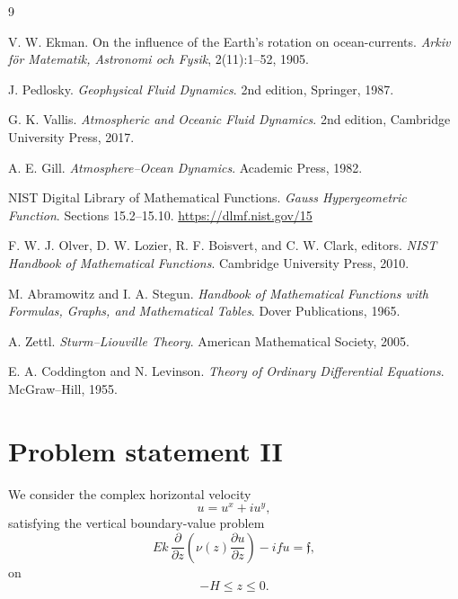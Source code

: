 \documentclass[10pt]{amsart}
\begin{document}
\begin{thebibliography}{9}

V. W. Ekman.
\newblock On the influence of the Earth's rotation on ocean-currents.
\newblock \emph{Arkiv f\"or Matematik, Astronomi och Fysik}, 2(11):1--52, 1905.

J. Pedlosky.
\newblock \emph{Geophysical Fluid Dynamics}.
\newblock 2nd edition, Springer, 1987.

G. K. Vallis.
\newblock \emph{Atmospheric and Oceanic Fluid Dynamics}.
\newblock 2nd edition, Cambridge University Press, 2017.

A. E. Gill.
\newblock \emph{Atmosphere--Ocean Dynamics}.
\newblock Academic Press, 1982.

NIST Digital Library of Mathematical Functions.
\newblock \emph{Gauss Hypergeometric Function}.
\newblock Sections 15.2--15.10.
\newblock \url{https://dlmf.nist.gov/15}

F. W. J. Olver, D. W. Lozier, R. F. Boisvert, and C. W. Clark, editors.
\newblock \emph{NIST Handbook of Mathematical Functions}.
\newblock Cambridge University Press, 2010.

M. Abramowitz and I. A. Stegun.
\newblock \emph{Handbook of Mathematical Functions with Formulas, Graphs, and Mathematical Tables}.
\newblock Dover Publications, 1965.

A. Zettl.
\newblock \emph{Sturm--Liouville Theory}.
\newblock American Mathematical Society, 2005.

E. A. Coddington and N. Levinson.
\newblock \emph{Theory of Ordinary Differential Equations}.
\newblock McGraw--Hill, 1955.

\end{thebibliography}

\clearpage

\section{Problem statement II}

We consider the complex horizontal velocity
\begin{equation}
u = u^x+i u^y,
\end{equation}
satisfying the vertical boundary-value problem
\begin{equation}
E k\,\frac{\partial}{\partial z}
\left(
\nu(z)\frac{\partial u}{\partial z}
\right)
-
i f u
=
\mathfrak f,
\label{eq:main}
\end{equation}
on
\[
-H\le z\le 0.
\]
\end{document}
